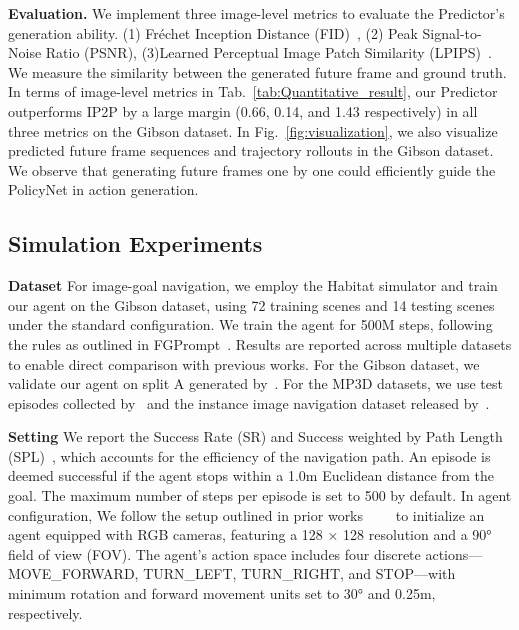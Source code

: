 \textbf{Evaluation.} We implement three image-level metrics to evaluate the Predictor's generation ability. (1) Fr\'echet Inception Distance (FID)~\cite{heusel2017gans}, (2) Peak Signal-to-Noise Ratio (PSNR), (3)Learned Perceptual Image Patch Similarity (LPIPS)~\cite{zhang2018unreasonable}. We measure the similarity between the generated future frame and ground truth. In terms of image-level metrics in Tab.~\ref{tab:Quantitative_result}, our Predictor outperforms IP2P by a large margin (0.66, 0.14, and 1.43 respectively) in all three metrics on the Gibson dataset.
%
In Fig.~\ref{fig:visualization}, we also visualize predicted future frame sequences and trajectory rollouts in the Gibson dataset. We observe that generating future frames one by one could efficiently guide the PolicyNet in action generation.





\subsection{Simulation Experiments}
\textbf{Dataset}
For image-goal navigation, we employ the Habitat simulator and train our agent on the Gibson dataset, using 72 training scenes and 14 testing scenes under the standard configuration. We train the agent for 500M steps, following the rules as outlined in FGPrompt~\cite{sun2024fgprompt}. Results are reported across multiple datasets to enable direct comparison with previous works. For the Gibson dataset, we validate our agent on split A generated by~\cite{mezghan2022memory}. For the MP3D datasets, we use test episodes collected by~\cite{al2022zero}  and the instance image navigation dataset released by~\cite{krantz2022instance}. 

\textbf{Setting}
We report the Success Rate (SR) and Success weighted by Path Length (SPL)~\cite{anderson2018evaluation}, which accounts for the efficiency of the navigation path. An episode is deemed successful if the agent stops within a 1.0m Euclidean distance from the goal. The maximum number of steps per episode is set to 500 by default.
In agent configuration, We follow the setup outlined in prior works~\cite{al2022zero}~\cite{majumdar2022zson}~\cite{yadav2023offline}~\cite{sun2024fgprompt} to initialize an agent equipped with RGB cameras, featuring a 128 × 128 resolution and a 90° field of view (FOV). The agent's action space includes four discrete actions—MOVE\_FORWARD, TURN\_LEFT, TURN\_RIGHT, and STOP—with minimum rotation and forward movement units set to 30° and 0.25m, respectively.



